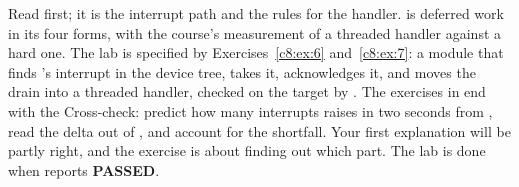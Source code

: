 Read  first; it is the interrupt path and the rules for the handler.
 is deferred work in its four forms, with the course's measurement of a threaded
handler against a hard one. The lab is specified by Exercises~\ref{c8:ex:6} and~\ref{c8:ex:7}: a
module that finds 's interrupt in the device tree, takes it, acknowledges it, and moves
the drain into a threaded handler, checked on the target by . The
exercises in  end with the Cross-check: predict how many interrupts
 raises in two seconds from , read the delta out of
, and account for the shortfall. Your first explanation will be partly right,
and the exercise is about finding out which part. The lab is done when 
reports \textbf{PASSED}.





